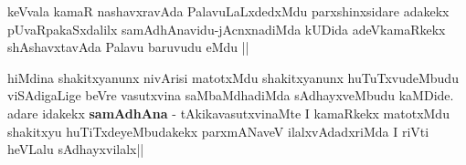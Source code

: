 
\begin{artha}
keVvala kamaR nashavxravAda PalavuLaLxdedxMdu parxshinxsidare adakekx pUvaRpakaSxdalilx samAdhAnavidu-jAcnxnadiMda kUDida adeVkamaRkekx shAshavxtavAda Palavu baruvudu eMdu ||
\end{artha}


\begin{artha}
hiMdina shakitxyanunx nivArisi matotxMdu shakitxyanunx huTuTxvudeMbudu viSAdigaLige beVre vasutxvina saMbaMdhadiMda sAdhayxveMbudu kaMDide. adare idakekx \textbf{samAdhAna} - tAkikavasutxvinaMte I kamaRkekx matotxMdu shakitxyu huTiTxdeyeMbudakekx parxmANaveV ilalxvAdadxriMda I riVti heVLalu sAdhayxvilalx||
\end{artha}
